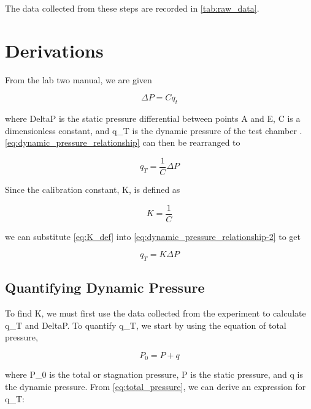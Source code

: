 \noindent{}The data collected from these steps are recorded in \autoref{tab:raw_data}.

\section{Derivations}

From the lab two manual, we are given

\begin{equation}\label{eq:dynamic_pressure_relationship}
    \Delta{}P = Cq_t
\end{equation}

\noindent{}where \gls{DeltaP} is the static pressure differential between points A and E, \gls{C} is a dimensionless constant, and \gls{q_T} is the dynamic pressure of the test chamber \citep{lab2-manual}. \autoref{eq:dynamic_pressure_relationship} can then be rearranged to

\begin{equation}\label{eq:dynamic_pressure_relationship-2}
    q_T = \frac{1}{C}\Delta{}P
\end{equation}

\noindent{}Since the calibration constant, \gls{K}, is defined as

\begin{equation}\label{eq:K_def}
    K = \frac{1}{C}
\end{equation}

\noindent{}we can substitute \autoref{eq:K_def} into \autoref{eq:dynamic_pressure_relationship-2} to get

\begin{equation}\label{eq:dynamic_pressure_relationship-3}
    q_T = K\Delta{}P
\end{equation}

\subsection{Quantifying Dynamic Pressure}\label{sec:quantify_dynamic_pressure}

To find \gls{K}, we must first use the data collected from the experiment to calculate \gls{q_T} and \gls{DeltaP}. To quantify \gls{q_T}, we start by using the equation of total pressure,

\begin{equation}\label{eq:total_pressure}
    P_0 = P + q
\end{equation}

\noindent{}where \gls{P_0} is the total or stagnation pressure, \gls{P} is the static pressure, and \gls{q} is the dynamic pressure. From \autoref{eq:total_pressure}, we can derive an expression for \gls{q_T}:

